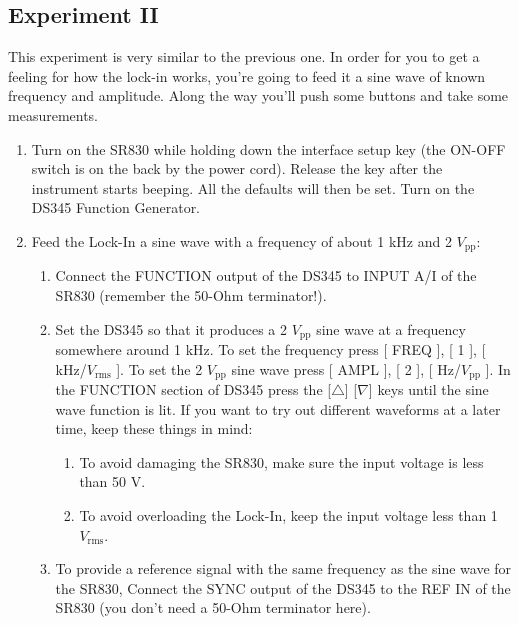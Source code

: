\documentclass{../lab}
\begin{document}
\subsection{Experiment II}

This experiment is very similar to the previous one. In order for you to get a feeling for how the lock-in works, you're going to feed it a sine wave of known frequency and amplitude. Along the way you'll push some buttons and take some measurements.

\begin{enumerate}
    \item Turn on the SR830 while holding down the interface setup key (the ON-OFF switch is on the back by the power cord). Release the key after the instrument starts beeping. All the defaults will then be set. Turn on the DS345 Function Generator.

    \item Feed the Lock-In a sine wave with a frequency of about 1 kHz and 2 $V_\text{pp}$:
    \begin{enumerate}
        \item Connect the FUNCTION output of the DS345 to INPUT A/I of the SR830 (remember the 50-Ohm terminator!).

        \item Set the DS345 so that it produces a 2 $V_\text{pp}$ sine wave at a frequency somewhere around 1 kHz. To set the frequency press [ FREQ ], [ 1 ], [ kHz/$V_\text{rms}$ ]. To set the 2 $V_\text{pp}$ sine wave press [ AMPL ], [ 2 ], [ Hz/$V_\text{pp}$ ]. In the FUNCTION section of DS345 press the [$\triangle$] [$\nabla$] keys until the sine wave function is lit. If you want to try out different waveforms at a later time, keep these things in mind:
        \begin{enumerate}
            \item To avoid damaging the SR830, make sure the input voltage is less than 50 V.

            \item To avoid overloading the Lock-In, keep the input voltage less than 1 $V_\text{rms}$.

        \end{enumerate}

        \item To provide a reference signal with the same frequency as the sine wave for the SR830, Connect the SYNC output of the DS345 to the REF IN of the SR830 (you don't need a 50-Ohm terminator here).


\end{enumerate}
\end{enumerate}
\end{document}
